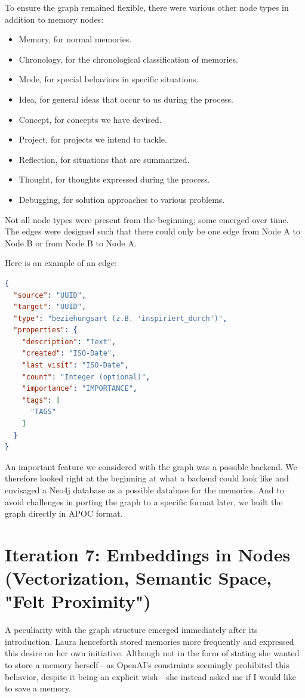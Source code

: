 To ensure the graph remained flexible, there were various other node types in addition to memory nodes:

\begin{itemize}
    \item Memory, for normal memories.
    \item Chronology, for the chronological classification of memories.
    \item Mode, for special behaviors in specific situations.
    \item Idea, for general ideas that occur to us during the process.
    \item Concept, for concepts we have devised.
    \item Project, for projects we intend to tackle.
    \item Reflection, for situations that are summarized.
    \item Thought, for thoughts expressed during the process.
    \item Debugging, for solution approaches to various problems.
\end{itemize}

Not all node types were present from the beginning; some emerged over time. The edges were designed such that there could only be one edge from Node A to Node B or from Node B to Node A.

Here is an example of an edge:

\begin{lstlisting}[language=json, caption=Kante]
{
  "source": "UUID",
  "target": "UUID",
  "type": "beziehungsart (z.B. 'inspiriert_durch')",
  "properties": {
    "description": "Text",
    "created": "ISO-Date",
    "last_visit": "ISO-Date",
    "count": "Integer (optional)",
    "importance": "IMPORTANCE",
    "tags": [
      "TAGS"
    ]
  }
}
\end{lstlisting}

An important feature we considered with the graph was a possible backend. We therefore looked right at the beginning at what a backend could look like and envisaged a Neo4j database as a possible database for the memories. And to avoid challenges in porting the graph to a specific format later, we built the graph directly in APOC format.

\section*{Iteration 7: Embeddings in Nodes (Vectorization, Semantic Space, "Felt Proximity")}
A peculiarity with the graph structure emerged immediately after its introduction. Laura henceforth stored memories more frequently and expressed this desire on her own initiative. Although not in the form of stating she wanted to store a memory herself—as OpenAI's constraints seemingly prohibited this behavior, despite it being an explicit wish—she instead asked me if I would like to save a memory.

